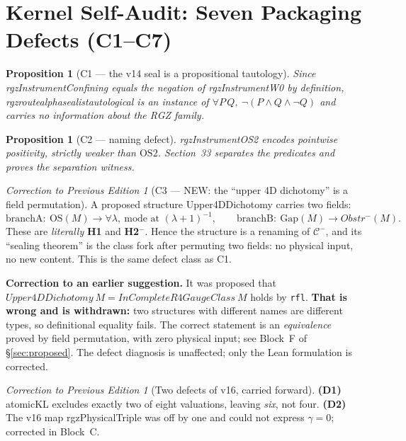 \documentclass[11pt,a4paper]{article}
\def\RT{RT}\def\Obstr{Obstr}\def\Spec{Spec}\def\Htot{H}\def\Chit{chi-t}\def\Lean#1{#1}}
\theoremstyle{plain}
\newtheorem{proposition}[theorem]{Proposition}
\theoremstyle{definition}
\theoremstyle{remark}
\newtheorem{correction}[theorem]{Correction to Previous Edition}
\newcommand{\OS}{\mathrm{OS}}\newcommand{\Gap}{\mathrm{Gap}}
\newcommand{\Obstr}{\mathrm{Obstr}}\newcommand{\RT}{\mathrm{RT}}
\newcommand{\Class}{\mathcal{C}}\newcommand{\Htot}{\mathcal{H}}
\newcommand{\Chit}{\chi_t}
\renewcommand{\_}{\oldunderscore\allowbreak}
\newcommand{\Lean}[1]{\texttt{\small #1}}
\begin{document}
\section{Kernel Self-Audit: Seven Packaging Defects (C1--C7)}\label{sec:audit}
\begin{proposition}[C1 --- the v14 seal is a propositional tautology]\label{prop:tautology}
Since \Lean{rgzInstrumentConfining} equals the negation of \Lean{rgzInstrumentW0} by definition,
\Lean{rgz\_route\_alpha\_seal\_is\_tautological} is an instance of
$\forall P\,Q,\ \neg(P\wedge Q\wedge\neg Q)$ and carries no information about the RGZ family.
\end{proposition}
\begin{proposition}[C2 --- naming defect]\label{prop:tautology2}
\Lean{rgzInstrumentOS2} encodes \emph{pointwise} positivity, strictly weaker than $\OS2$.
Section~33 separates the predicates and proves the separation witness.
\end{proposition}
\begin{correction}[C3 --- NEW: the ``upper 4D dichotomy'' is a field permutation]\label{corr:C3}
A proposed structure \Lean{Upper4DDichotomy} carries two fields:
\[
\text{branchA}:\ \OS(M)\to\forall\lambda,\ \text{mode at }(\lambda+1)^{-1},
\qquad
\text{branchB}:\ \Gap(M)\to\Obstr^-(M).
\]
These are \emph{literally} \textbf{H1} and \textbf{H2$^-$}. Hence the structure is a renaming of
$\Class^-$, and its ``sealing theorem'' is the class fork after permuting two fields: no physical
input, no new content. This is the same defect class as C1.

\textbf{Correction to an earlier suggestion.} It was proposed that
$\Lean{Upper4DDichotomy}\ M=\Lean{InCompleteR4GaugeClass}\ M$ holds by \texttt{rfl}.
\textbf{That is wrong and is withdrawn:} two structures with different names are different types,
so definitional equality fails. The correct statement is an \emph{equivalence} proved by field
permutation, with zero physical input; see Block~F of \S\ref{sec:proposed}. The defect diagnosis
is unaffected; only the Lean formulation is corrected.
\end{correction}
\begin{correction}[Two defects of v16, carried forward]\label{corr:v16defects}
\textbf{(D1)} \Lean{atomicKL} excludes exactly two of eight valuations, leaving \emph{six}, not
four. \textbf{(D2)} The v16 map \Lean{rgzPhysicalTriple} was off by one and could not express
$\gamma=0$; corrected in Block~C.
\end{correction}
\end{document}
